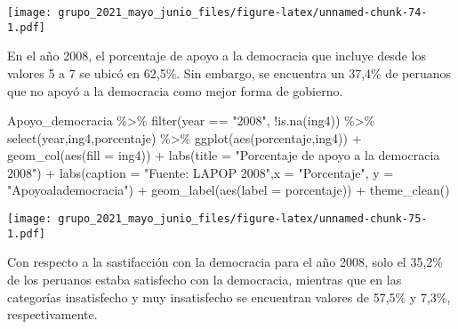 \documentclass[
]{book}
\newenvironment{Shaded}{\begin{snugshade}}{\end{snugshade}}
\newcommand{\AttributeTok}[1]{\textcolor[rgb]{0.77,0.63,0.00}{#1}}
\newcommand{\FunctionTok}[1]{\textcolor[rgb]{0.00,0.00,0.00}{#1}}
\newcommand{\NormalTok}[1]{#1}
\newcommand{\SpecialCharTok}[1]{\textcolor[rgb]{0.00,0.00,0.00}{#1}}
\newcommand{\StringTok}[1]{\textcolor[rgb]{0.31,0.60,0.02}{#1}}
\begin{document}
\texttt{[image: grupo\_2021\_mayo\_junio\_files/figure-latex/unnamed-chunk-74-1.pdf]}

En el año 2008, el porcentaje de apoyo a la democracia que incluye desde los valores 5 a 7 se ubicó en 62,5\%. Sin embargo, se encuentra un 37,4\% de peruanos que no apoyó a la democracia como mejor forma de gobierno.

\begin{Shaded}
\begin{Highlighting}[]
\NormalTok{Apoyo\_democracia }\SpecialCharTok{\%\textgreater{}\%}
  \FunctionTok{filter}\NormalTok{(year }\SpecialCharTok{==} \StringTok{"2008"}\NormalTok{, }\SpecialCharTok{!}\FunctionTok{is.na}\NormalTok{(ing4)) }\SpecialCharTok{\%\textgreater{}\%}
  \FunctionTok{select}\NormalTok{(year,ing4,porcentaje) }\SpecialCharTok{\%\textgreater{}\%}
  \FunctionTok{ggplot}\NormalTok{(}\FunctionTok{aes}\NormalTok{(porcentaje,ing4)) }\SpecialCharTok{+} 
  \FunctionTok{geom\_col}\NormalTok{(}\FunctionTok{aes}\NormalTok{(}\AttributeTok{fill =}\NormalTok{ ing4)) }\SpecialCharTok{+}
  \FunctionTok{labs}\NormalTok{(}\AttributeTok{title =} \StringTok{"Porcentaje de apoyo a la democracia 2008"}\NormalTok{) }\SpecialCharTok{+}
  \FunctionTok{labs}\NormalTok{(}\AttributeTok{caption =} \StringTok{"Fuente: LAPOP 2008"}\NormalTok{,}\AttributeTok{x =} \StringTok{"Porcentaje"}\NormalTok{, }\AttributeTok{y =} \StringTok{"Apoyoalademocracia"}\NormalTok{) }\SpecialCharTok{+}
  \FunctionTok{geom\_label}\NormalTok{(}\FunctionTok{aes}\NormalTok{(}\AttributeTok{label =}\NormalTok{ porcentaje)) }\SpecialCharTok{+}
  \FunctionTok{theme\_clean}\NormalTok{()}
\end{Highlighting}
\end{Shaded}

\texttt{[image: grupo\_2021\_mayo\_junio\_files/figure-latex/unnamed-chunk-75-1.pdf]}

Con respecto a la sastifacción con la democracia para el año 2008, solo el 35,2\% de los peruanos estaba satisfecho con la democracia, mientras que en las categorías insatisfecho y muy insatisfecho se encuentran valores de 57,5\% y 7,3\%, respectivamente.
\end{document}
